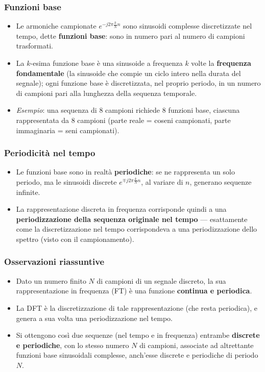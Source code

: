 \documentclass[12pt, a4paper]{article}
\begin{document}
\subsubsection{Funzioni base}
\begin{itemize}
    \item Le armoniche campionate $e^{-j2\pi\frac{k}{N}n}$ sono sinusoidi complesse discretizzate nel tempo, dette \textbf{funzioni base}: sono in numero pari al numero di campioni trasformati.
    \item La $k$-esima funzione base è una sinusoide a frequenza $k$ volte la \textbf{frequenza fondamentale} (la sinusoide che compie un ciclo intero nella durata del segnale); ogni funzione base è discretizzata, nel proprio periodo, in un numero di campioni pari alla lunghezza della sequenza temporale.
    \item \textit{Esempio}: una sequenza di $8$ campioni richiede $8$ funzioni base, ciascuna rappresentata da $8$ campioni (parte reale = coseni campionati, parte immaginaria = seni campionati).
\end{itemize}

\subsubsection{Periodicità nel tempo}
\begin{itemize}
    \item Le funzioni base sono in realtà \textbf{periodiche}: se ne rappresenta un solo periodo, ma le sinusoidi discrete $e^{\mp j2\pi\frac{k}{N}n}$, al variare di $n$, generano sequenze infinite.
    \item La rappresentazione discreta in frequenza corrisponde quindi a una \textbf{periodizzazione della sequenza originale nel tempo} — esattamente come la discretizzazione nel tempo corrispondeva a una periodizzazione dello spettro (visto con il campionamento).
\end{itemize}

\subsubsection{Osservazioni riassuntive}
\begin{itemize}
    \item Dato un numero finito $N$ di campioni di un segnale discreto, la sua rappresentazione in frequenza (FT) è una funzione \textbf{continua e periodica}.
    \item La DFT è la discretizzazione di tale rappresentazione (che resta periodica), e genera a sua volta una periodizzazione nel tempo.
    \item Si ottengono così due sequenze (nel tempo e in frequenza) entrambe \textbf{discrete e periodiche}, con lo stesso numero $N$ di campioni, associate ad altrettante funzioni base sinusoidali complesse, anch'esse discrete e periodiche di periodo $N$.
\end{itemize}
\end{document}
